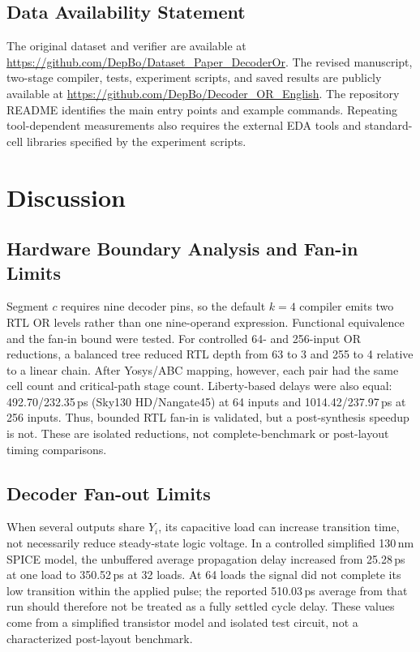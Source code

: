 \documentclass[runningheads]{llncs}
\begin{document}
\subsection{Data Availability Statement}
The original dataset and verifier are available at \url{https://github.com/DepBo/Dataset_Paper_DecoderOr}. The revised manuscript, two-stage compiler, tests, experiment scripts, and saved results are publicly available at \url{https://github.com/DepBo/Decoder_OR_English}. The repository README identifies the main entry points and example commands. Repeating tool-dependent measurements also requires the external EDA tools and standard-cell libraries specified by the experiment scripts.

\section{Discussion}
\subsection{Hardware Boundary Analysis and Fan-in Limits}
Segment $c$ requires nine decoder pins, so the default $k=4$ compiler emits two RTL OR levels rather than one nine-operand expression. Functional equivalence and the fan-in bound were tested. For controlled 64- and 256-input OR reductions, a balanced tree reduced RTL depth from 63 to 3 and 255 to 4 relative to a linear chain. After Yosys/ABC mapping, however, each pair had the same cell count and critical-path stage count. Liberty-based delays were also equal: 492.70/232.35\,ps (Sky130 HD/Nangate45) at 64 inputs and 1014.42/237.97\,ps at 256 inputs. Thus, bounded RTL fan-in is validated, but a post-synthesis speedup is not. These are isolated reductions, not complete-benchmark or post-layout timing comparisons.

\subsection{Decoder Fan-out Limits}
When several outputs share $Y_i$, its capacitive load can increase transition time, not necessarily reduce steady-state logic voltage. In a controlled simplified 130\,nm SPICE model, the unbuffered average propagation delay increased from 25.28\,ps at one load to 350.52\,ps at 32 loads. At 64 loads the signal did not complete its low transition within the applied pulse; the reported 510.03\,ps average from that run should therefore not be treated as a fully settled cycle delay. These values come from a simplified transistor model and isolated test circuit, not a characterized post-layout benchmark.
\end{document}

